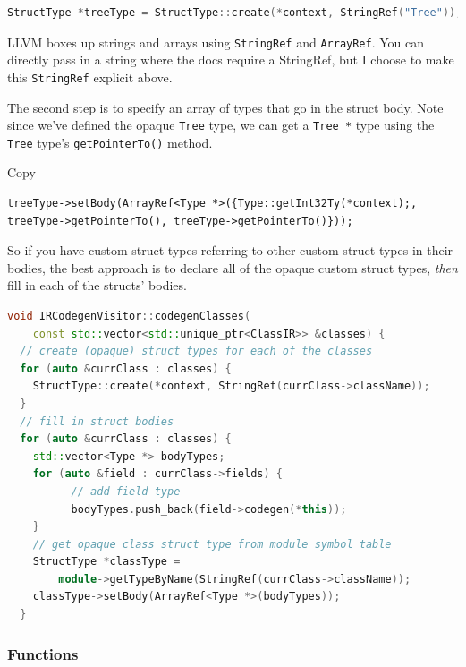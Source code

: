 
\begin{lstlisting}[language=C++]
StructType *treeType = StructType::create(*context, StringRef("Tree"));
\end{lstlisting}

LLVM boxes up strings and arrays using \texttt{StringRef} and
\texttt{ArrayRef}. You can directly pass in a string where the docs
require a StringRef, but I choose to make this \texttt{StringRef}
explicit above.

The second step is to specify an array of types that go in the struct
body. Note since we've defined the opaque \texttt{Tree} type, we can get
a \texttt{Tree\ *} type using the \texttt{Tree} type's
\texttt{getPointerTo()} method.

Copy

\begin{verbatim}
treeType->setBody(ArrayRef<Type *>({Type::getInt32Ty(*context);, treeType->getPointerTo(), treeType->getPointerTo()}));
\end{verbatim}

So if you have custom struct types referring to other custom struct
types in their bodies, the best approach is to declare all of the opaque
custom struct types, \emph{then} fill in each of the structs' bodies.

%

\begin{lstlisting}[language=C++,caption={class\_codegen.cc}]
void IRCodegenVisitor::codegenClasses(
    const std::vector<std::unique_ptr<ClassIR>> &classes) {
  // create (opaque) struct types for each of the classes
  for (auto &currClass : classes) {
    StructType::create(*context, StringRef(currClass->className));
  }
  // fill in struct bodies
  for (auto &currClass : classes) {
    std::vector<Type *> bodyTypes;
    for (auto &field : currClass->fields) {
          // add field type
          bodyTypes.push_back(field->codegen(*this));
    }
    // get opaque class struct type from module symbol table
    StructType *classType =
        module->getTypeByName(StringRef(currClass->className));
    classType->setBody(ArrayRef<Type *>(bodyTypes));
  }
\end{lstlisting}

\subsubsection{Functions}

